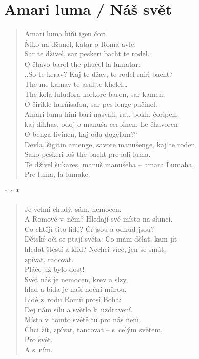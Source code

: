 
\bigskip

\section{Amari luma / Náš svět}

\begin{verse}
Amari luma hiňi igen čori \\
Ňiko na džanel, katar o Roma avle, \\
Sar te dživel, sar peskeri bacht te rodel. \\
O čhavo barol the phučel la lumatar: \\
,,So te kerav? Kaj te džav, te rodel miri bacht? \\
The me kamav te asal,te khelel\ldots \\
The kola luluďora korkore baron, sar kamen, \\
O čirikle hurňisaľon, sar pes lenge pačinel. \\
Amari luma hini bari nasvaľi, rat, bokh, čoripen, \\
kaj dikhas, odoj o manuša cerpinen. Le čhavoren \\ 
O benga livinen, kaj  oda dogeľam?`` \\
Devla, šigitin amenge, savore manušenge, kaj te roden \\
Sako peskeri loš the bacht pre adi luma.  \\
Te dživel šukares, manuš manušeha – amara Lumaha, \\
Pre luma, la lumake.
\end{verse}

\medskip

\begin{center}
* * *
\end{center}

\medskip

\begin{verse}
Je velmi chudý, sám, nemocen. \\
A Romové v něm? Hledají své místo na slunci. \\
Co chtějí tito lidé? Čí jsou a odkud jsou? \\
Dětské oči se ptají světa: Co mám dělat, kam  jít \\ 
hledat štěstí a klid? Nechci více, jen se smát, \\
 \hspace{\fill}zpívat, radovat. \\
Pláče již bylo dost! \\
Svět náš je nemocen, krev a slzy, \\
 \hspace{\fill}hlad a bída je naší noční můrou. \\
Lidé z rodu Romů prosí Boha: \\
 \hspace{\fill}Dej nám sílu a světlo k uzdravení. \\
Místa v tomto světě tu pro nás není. \\
Chci žít, zpívat, tancovat -- s celým světem, \\
Pro svět. \\
A s ním.
\end{verse}

